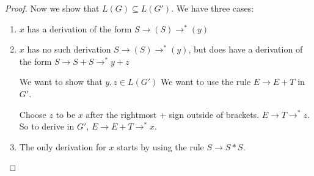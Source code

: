 \documentclass[12pt]{article}
\begin{document}
\begin{proof}
	Now we show that $L(G) \subseteq L(G')$. We have three cases:
	\begin{enumerate}
		\item $x$ has a derivation of the form $S \to (S) \to^* (y)$
		\item $x$ has no such derivation $S \to (S) \to^* (y)$, but does have a
			derivation of the form $S \to S+S\to^*y+z$

			We want to show that $y,z \in L(G')$ We want to use the rule $E \to
			E + T$ in $G'$.

			Choose $z$ to be $x$ after the rightmost + sign outside of brackets.
			$E \to T \to^*z$. So to derive in $G'$, $E \to E + T \to^*x$.
		\item The only derivation for $x$ starts by using the rule $S \to S*S$.
	\end{enumerate}
	
\end{proof}
\end{document}
